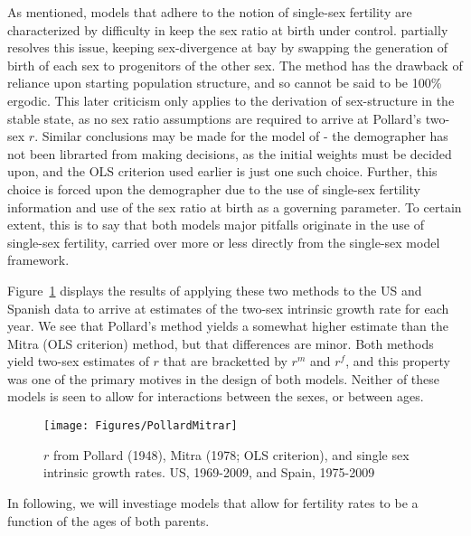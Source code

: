 \FloatBarrier
As mentioned, models that adhere to the notion of single-sex fertility are
characterized by difficulty in keep the sex ratio at birth under control.
\citet{pollard1948measurement} partially resolves this issue, keeping
sex-divergence at bay by swapping the generation of birth of each sex to
progenitors of the other sex. The method has the drawback of reliance upon
starting population structure\citep{yntema1952mathematical}, and so cannot be
said to be 100\% ergodic. This later criticism only applies to the derivation of sex-structure in the stable
state, as no sex ratio assumptions are required to arrive at Pollard's two-sex
$r$. Similar conclusions may be made for the model of
\citet{mitra1978derivation}- the demographer has not been librarted from making
decisions, as the initial weights must be decided upon, and the OLS criterion
used earlier is just one such choice. Further, this choice is forced upon the
demographer due to the use of single-sex fertility information and use of the
sex ratio at birth as a governing parameter. To certain extent, this is to say
that both models major pitfalls originate in the use of single-sex fertility,
carried over more or less directly from the single-sex model framework.

Figure~\ref{fig:PollardMitrar} displays the results of applying these two
methods to the US and Spanish data to arrive at estimates of the two-sex 
intrinsic growth rate for each year. We see that
Pollard's method yields a somewhat higher estimate than the Mitra (OLS
criterion) method, but that differences are minor. Both methods yield two-sex
estimates of $r$ that are bracketted by $r^m$ and $r^f$, and this property was
one of the primary motives in the design of both models. Neither of these models
is seen to allow for interactions between the sexes, or between ages.

\begin{figure}[ht!]
        \centering  
          \caption{$r$ from Pollard (1948), Mitra (1978; OLS criterion),
          and single sex intrinsic growth rates. US, 1969-2009, and Spain, 1975-2009}
           \texttt{[image: Figures/PollardMitrar]}
          \label{fig:PollardMitrar}
\end{figure}

In following, we will investiage models that allow for fertility
rates to be a function of the ages of both parents.

\FloatBarrier


